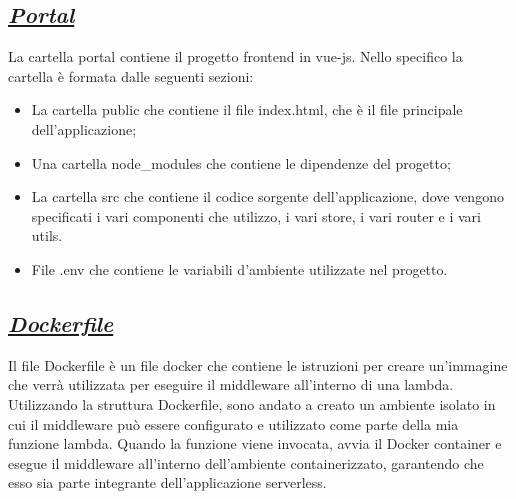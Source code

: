 \subsection*{\normalsize\textit{\uline{Portal}}}
La cartella portal contiene il progetto frontend in vue-js. Nello specifico la cartella è formata dalle seguenti sezioni:
\begin{itemize}
  \item La cartella public che contiene il file index.html, che è il file principale dell'applicazione;
  \item Una cartella node\_modules che contiene le dipendenze del progetto;
  \item La cartella src che contiene il codice sorgente dell'applicazione, dove vengono specificati i vari componenti che utilizzo, i vari store, i vari router e i vari utils.
  \item File .env che contiene le variabili d'ambiente utilizzate nel progetto.
\end{itemize}

\subsection*{\normalsize\textit{\uline{Dockerfile}}}
Il file Dockerfile è un file docker che contiene le istruzioni per creare un'immagine che verrà utilizzata per eseguire il middleware all'interno di una lambda.\\
Utilizzando la struttura Dockerfile, sono andato a creato un ambiente isolato in cui il middleware può essere configurato e utilizzato come parte della mia funzione 
lambda. Quando la funzione viene invocata, avvia il Docker container e esegue il middleware all'interno dell'ambiente containerizzato, 
garantendo che esso sia parte integrante dell'applicazione serverless.











